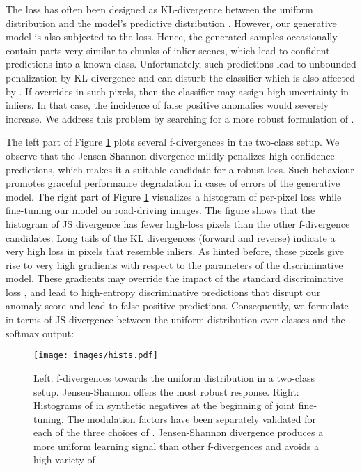 \documentclass[lettersize,journal,hidelinks]{IEEEtran}
\begin{document}
The loss  has often been designed as KL-divergence between the uniform distribution and the model's predictive distribution \cite{lee18iclr,hendrycks17iclr,dhamija18nips}.
However, our generative model is also subjected to the  loss.
Hence, the generated samples occasionally contain parts 
 very similar to chunks of inlier scenes, which lead to confident predictions into a known class.
Unfortunately, such predictions lead to unbounded penalization by KL divergence and can disturb the classifier which is also affected by .
If  overrides  in such pixels, then the classifier may assign high uncertainty in inliers. 
In that case, 
the incidence of false positive anomalies would severely increase. 
We address this problem by searching 
for a more robust formulation of .



The left part of Figure \ref{fig:theory-ood-1} plots several f-divergences in the two-class setup.
We observe that the Jensen-Shannon divergence mildly penalizes high-confidence predictions, which makes it a suitable candidate for a robust loss.
Such behaviour promotes graceful performance degradation in cases of errors of the generative model.
The right part of Figure \ref{fig:theory-ood-1} visualizes a histogram of per-pixel loss while fine-tuning our model on road-driving images.
The figure shows that the histogram of JS divergence has fewer high-loss pixels than the other f-divergence candidates.
Long tails of the KL divergences (forward and reverse) indicate a very high loss in pixels that resemble inliers.
As hinted before, these pixels give rise to very high gradients with respect to the parameters of the discriminative model.
These gradients may override the impact of the standard discriminative loss , and lead to high-entropy discriminative predictions that disrupt our anomaly score and lead to false positive predictions.  
Consequently, we formulate  in terms of JS divergence between the uniform distribution over classes and the softmax output:


\begin{figure}[!ht]
    \centering
    \texttt{[image: images/hists.pdf]}
    \caption{Left: f-divergences towards the uniform distribution in a two-class setup.
Jensen-Shannon offers the most robust response.
Right: Histograms of  in synthetic negatives 
at the beginning of joint fine-tuning.
The modulation factors 
have been separately validated
for each of the three choices of .
Jensen-Shannon divergence produces a more uniform learning signal than other f-divergences and avoids a high variety of .}
    \label{fig:theory-ood-1}
\end{figure}
\end{document}
